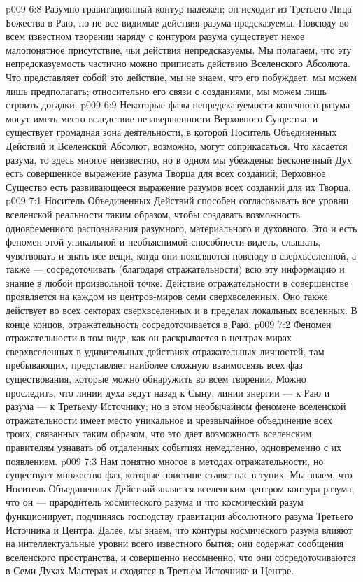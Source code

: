 \vs p009 6:8 \pc Разумно\hyp{}гравитационный контур надежен; он исходит из Третьего Лица Божества в Раю, но не все видимые действия разума предсказуемы. Повсюду во всем известном творении наряду с контуром разума существует некое малопонятное присутствие, чьи действия непредсказуемы. Мы полагаем, что эту непредсказуемость частично можно приписать действию Вселенского Абсолюта. Что представляет собой это действие, мы не знаем, что его побуждает, мы можем лишь предполагать; относительно его связи с созданиями, мы можем лишь строить догадки.
\vs p009 6:9 \pc Некоторые фазы непредсказуемости конечного разума могут иметь место вследствие незавершенности Верховного Существа, и существует громадная зона деятельности, в которой Носитель Объединенных Действий и Вселенский Абсолют, возможно, могут соприкасаться. Что касается разума, то здесь многое неизвестно, но в одном мы убеждены: Бесконечный Дух есть совершенное выражение разума Творца для всех созданий; Верховное Существо есть развивающееся выражение разумов всех созданий для их Творца.
\vs p009 7:1 Носитель Объединенных Действий способен согласовывать все уровни вселенской реальности таким образом, чтобы создавать возможность одновременного распознавания разумного, материального и духовного. Это и есть феномен  этой уникальной и необъяснимой способности видеть, слышать, чувствовать и знать все вещи, когда они появляются повсюду в сверхвселенной, а также --- сосредоточивать (благодаря отражательности) всю эту информацию и знание в любой произвольной точке. Действие отражательности в совершенстве проявляется на каждом из центров\hyp{}миров семи сверхвселенных. Оно также действует во всех секторах сверхвселенных и в пределах локальных вселенных. В конце концов, отражательность сосредоточивается в Раю.
\vs p009 7:2 Феномен отражательности в том виде, как он раскрывается в центрах\hyp{}мирах сверхвселенных в удивительных действиях отражательных личностей, там пребывающих, представляет наиболее сложную взаимосвязь всех фаз существования, которые можно обнаружить во всем творении. Можно проследить, что линии духа ведут назад к Сыну, линии энергии --- к Раю и разума --- к Третьему Источнику; но в этом необычайном феномене вселенской отражательности имеет место уникальное и чрезвычайное объединение всех троих, связанных таким образом, что это дает возможность вселенским правителям узнавать об отдаленных событиях немедленно, одновременно с их появлением.
\vs p009 7:3 Нам понятно многое в методах отражательности, но существует множество фаз, которые поистине ставят нас в тупик. Мы знаем, что Носитель Объединенных Действий является вселенским центром контура разума, что он --- прародитель космического разума и что космический разум функционирует, подчиняясь господству гравитации абсолютного разума Третьего Источника и Центра. Далее, мы знаем, что контуры космического разума влияют на интеллектуальные уровни всего известного бытия; они содержат сообщения вселенского пространства, и совершенно несомненно, что они сосредоточиваются в Семи Духах\hyp{}Мастерах и сходятся в Третьем Источнике и Центре.
